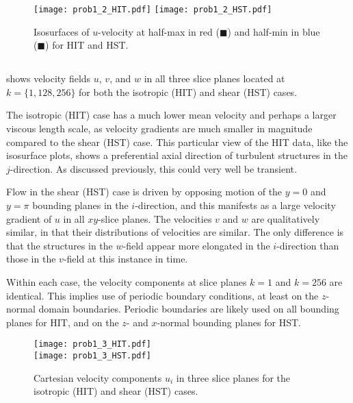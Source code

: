 \documentclass[11pt]{article}
\begin{document}
\begin{figure}[t]
\centering
\texttt{[image: prob1\_2\_HIT.pdf]}
\texttt{[image: prob1\_2\_HST.pdf]}
\vspace{6pt}
\caption{Isosurfaces of $u$-velocity at half-max in red ({\color{red}$\blacksquare$}) and half-min in blue ({\color{blue}$\blacksquare$}) for HIT and HST.}
\label{fig:prob_1_2_isosurfaces}
\end{figure}

\subsection{}

 shows velocity fields $u$, $v$, and $w$ in all three slice planes located at $k = \{1, 128, 256\}$ for both the isotropic (HIT) and shear (HST) cases.

The isotropic (HIT) case has a much lower mean velocity and perhaps a larger viscous length scale, as velocity gradients are much smaller in magnitude compared to the shear (HST) case. This particular view of the HIT data, like the isosurface plots, shows a preferential axial direction of turbulent structures in the $j$-direction. As discussed previously, this could very well be transient.

Flow in the shear (HST) case is driven by opposing motion of the $y=0$ and $y=\pi$ bounding planes in the $i$-direction, and this manifests as a large velocity gradient of $u$ in all $xy$-slice planes. The velocities $v$ and $w$ are qualitatively similar, in that their distributions of velocities are similar. The only difference is that the structures in the $w$-field appear more elongated in the $i$-direction than those in the $v$-field at this instance in time.

Within each case, the velocity components at slice planes $k=1$ and $k=256$ are identical. This implies use of periodic boundary conditions, at least on the $z$-normal domain boundaries. Periodic boundaries are likely used on all bounding planes for HIT, and on the $z$- and $x$-normal bounding planes for HST.

\begin{figure}[h!]
\centering
\texttt{[image: prob1\_3\_HIT.pdf]}
\\
\texttt{[image: prob1\_3\_HST.pdf]}
\\[6pt]
\caption{Cartesian velocity components $u_i$ in three slice planes for the isotropic (HIT) and shear (HST) cases.}
\label{fig:prob_1_3_slices}
\end{figure}
\end{document}
